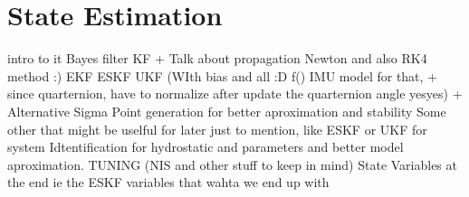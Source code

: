 \section{State Estimation}

intro to it
Bayes filter
KF + Talk about propagation Newton and also RK4 method :)
EKF
ESKF
UKF (WIth bias and all :D f() IMU model for that, + since quarternion, have to normalize after update the quarternion angle yesyes) + Alternative Sigma Point generation for better aproximation and stability
Some other that might be uselful for later just to mention, like ESKF or UKF for system Idtentification for hydrostatic and parameters and better model aproximation.
TUNING (NIS and other stuff to keep in mind)
State Variables at the end ie the ESKF variables that wahta we end up with
